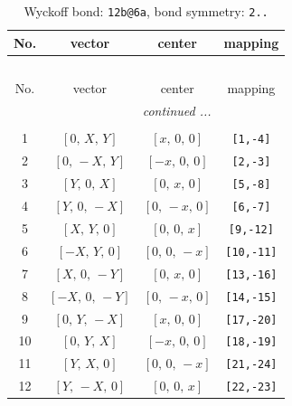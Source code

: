 \documentclass[fleqn,8pt]{jsarticle}
\begin{document}
\begin{longtable}{cccc}
\caption{Wyckoff bond: {\tt 12b@6a}, bond symmetry: {\tt 2..}}
 \\
 \hline \hline
No. & vector & center & mapping \\ \hline \endfirsthead

\multicolumn{3}{l}{\tablename\ \thetable{}} \\
 \hline \hline
No. & vector & center & mapping \\ \hline \endhead

 \hline \hline
\multicolumn{3}{r}{\footnotesize\it continued ...} \\ \endfoot

 \hline \hline
\multicolumn{3}{r}{} \\ \endlastfoot

1 & $\left[ 0,\, X,\, Y \right]$ & $\left[ x,\, 0,\, 0 \right]$ & {\tt [1,-4]} \\ \hline
2 & $\left[ 0,\, - X,\, Y \right]$ & $\left[ - x,\, 0,\, 0 \right]$ & {\tt [2,-3]} \\ \hline
3 & $\left[ Y,\, 0,\, X \right]$ & $\left[ 0,\, x,\, 0 \right]$ & {\tt [5,-8]} \\ \hline
4 & $\left[ Y,\, 0,\, - X \right]$ & $\left[ 0,\, - x,\, 0 \right]$ & {\tt [6,-7]} \\ \hline
5 & $\left[ X,\, Y,\, 0 \right]$ & $\left[ 0,\, 0,\, x \right]$ & {\tt [9,-12]} \\ \hline
6 & $\left[ - X,\, Y,\, 0 \right]$ & $\left[ 0,\, 0,\, - x \right]$ & {\tt [10,-11]} \\ \hline
7 & $\left[ X,\, 0,\, - Y \right]$ & $\left[ 0,\, x,\, 0 \right]$ & {\tt [13,-16]} \\ \hline
8 & $\left[ - X,\, 0,\, - Y \right]$ & $\left[ 0,\, - x,\, 0 \right]$ & {\tt [14,-15]} \\ \hline
9 & $\left[ 0,\, Y,\, - X \right]$ & $\left[ x,\, 0,\, 0 \right]$ & {\tt [17,-20]} \\ \hline
10 & $\left[ 0,\, Y,\, X \right]$ & $\left[ - x,\, 0,\, 0 \right]$ & {\tt [18,-19]} \\ \hline
11 & $\left[ Y,\, X,\, 0 \right]$ & $\left[ 0,\, 0,\, - x \right]$ & {\tt [21,-24]} \\ \hline
12 & $\left[ Y,\, - X,\, 0 \right]$ & $\left[ 0,\, 0,\, x \right]$ & {\tt [22,-23]} \\
\end{longtable}
\renewcommand{\arraystretch}{1.2}
\end{document}
